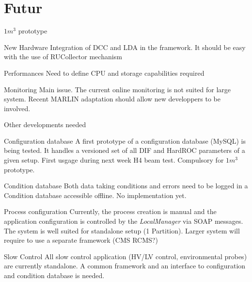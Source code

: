 \documentclass[10pt]{beamer}
\begin{document}
\section{Futur}



\begin{frame}{$ 1 m^3 $ prototype }

\begin{block}{New Hardware}
 Integration of DCC and LDA in the framework. It should be easy with the use of RUCollector mechanism
\end{block}
\begin{block}{Performances}
Need to define CPU and storage capabilities required
\end{block}
\begin{alertblock}{Monitoring}
Main issue. The current online monitoring is not suited for large system. Recent MARLIN adaptation should allow new developpers to be involved.
\end{alertblock}


\end{frame}

\begin{frame}[shrink=15]{ Other developments needed}

  \begin{block}{Configuration database}
A first prototype of a configuration database (MySQL) is being tested. It handles  a versioned set of all DIF and HardROC parameters of a given setup. First usgage during next week H4 beam test. Compulsory for $1 m^3$ prototype.
  \end{block}
  \pause \begin{block}{Condition database}
    Both data taking conditions and errors need to be logged in a Condition database accessible offline. No implementation yet.
  \end{block}

  \pause \begin{block}{Process configuration}
Currently, the process creation is manual and the application configuration is controlled by the {\sl LocalManager} via SOAP messages. The system is well suited for standalone setup (1 Partition). Larger system will require to use a separate framework (CMS RCMS?) 
\end{block}

  \pause \begin{block}{Slow Control}
All slow control application (HV/LV control, environmental probes) are currently standalone. A common framework and an interface to configuration and condition database is needed.
\end{block}

\end{frame}
\end{document}
